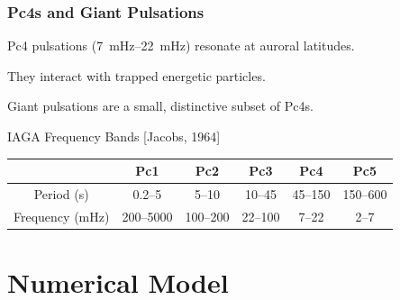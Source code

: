 \documentclass{beamer}
\begin{document}
\begin{frame}
\frametitle{Pc4s and Giant Pulsations}

\begin{wideitemize}
\item Pc4 pulsations (\SIrange{7}{22}{\mHz}) resonate at auroral latitudes. 
\item They interact with trapped energetic particles. 
\item Giant pulsations are a small, distinctive subset of Pc4s.  
\end{wideitemize}

\vfill

\begin{center}
IAGA Frequency Bands [Jacobs, 1964]
\begin{tabular}{ @{\extracolsep{\fill}} cccccc @{\extracolsep{\fill}} }
  \hline
  & Pc1 & Pc2 & Pc3 & Pc4 & Pc5 \\
  \hline
  Period (\si{\second}) & 0.2--5    & 5--10    & 10--45  & 45--150 & 150--600 \\
  Frequency (\si{\mHz}) & 200--5000 & 100--200 & 22--100 & 7--22   & 2--7     \\
  \hline
\end{tabular}
\end{center}

\end{frame}


\section{Numerical Model}

\end{document}
